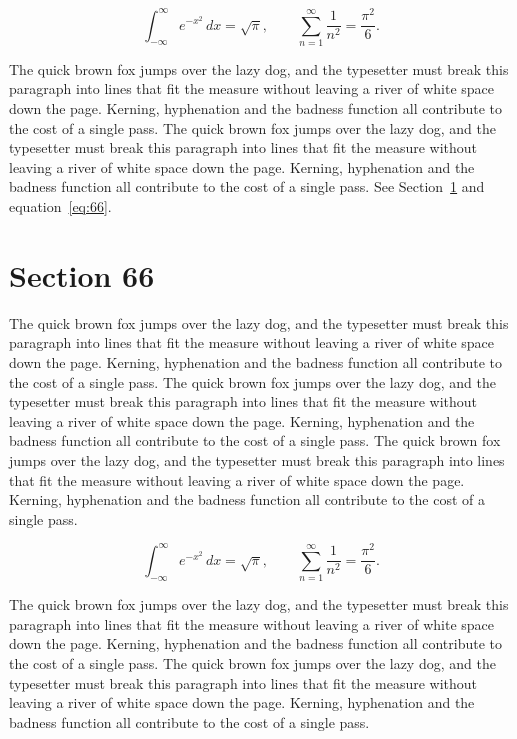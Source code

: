\documentclass{article}
\begin{document}
\begin{equation}\label{eq:65}
\int_{-\infty}^{\infty} e^{-x^{2}}\,dx = \sqrt{\pi}, \qquad
\sum_{n=1}^{\infty} \frac{1}{n^{2}} = \frac{\pi^{2}}{6}.
\end{equation}

The quick brown fox jumps over the lazy dog, and the typesetter must break this paragraph into lines that fit the measure without leaving a river of white space down the page. Kerning, hyphenation and the badness function all contribute to the cost of a single pass. The quick brown fox jumps over the lazy dog, and the typesetter must break this paragraph into lines that fit the measure without leaving a river of white space down the page. Kerning, hyphenation and the badness function all contribute to the cost of a single pass. 
See Section~\ref{sec:66} and equation~\eqref{eq:66}.
\section{Section 66}
\label{sec:66}
The quick brown fox jumps over the lazy dog, and the typesetter must break this paragraph into lines that fit the measure without leaving a river of white space down the page. Kerning, hyphenation and the badness function all contribute to the cost of a single pass. The quick brown fox jumps over the lazy dog, and the typesetter must break this paragraph into lines that fit the measure without leaving a river of white space down the page. Kerning, hyphenation and the badness function all contribute to the cost of a single pass. The quick brown fox jumps over the lazy dog, and the typesetter must break this paragraph into lines that fit the measure without leaving a river of white space down the page. Kerning, hyphenation and the badness function all contribute to the cost of a single pass. 

\begin{equation}\label{eq:66}
\int_{-\infty}^{\infty} e^{-x^{2}}\,dx = \sqrt{\pi}, \qquad
\sum_{n=1}^{\infty} \frac{1}{n^{2}} = \frac{\pi^{2}}{6}.
\end{equation}

The quick brown fox jumps over the lazy dog, and the typesetter must break this paragraph into lines that fit the measure without leaving a river of white space down the page. Kerning, hyphenation and the badness function all contribute to the cost of a single pass. The quick brown fox jumps over the lazy dog, and the typesetter must break this paragraph into lines that fit the measure without leaving a river of white space down the page. Kerning, hyphenation and the badness function all contribute to the cost of a single pass. 
\end{document}
